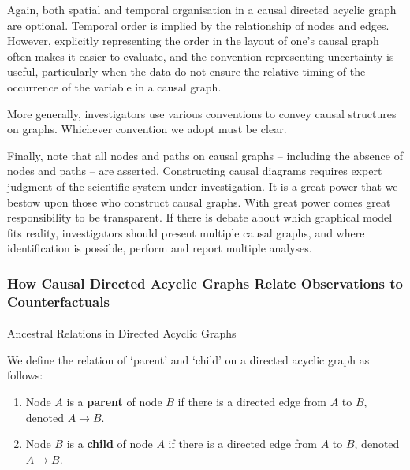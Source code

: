 \documentclass[
  single column]{article}
\makeatletter
\let\oldparagraph\paragraph
\renewcommand{\paragraph}{
    \@ifstar
      \xxxParagraphStar
      \xxxParagraphNoStar
  }
\newcommand{\xxxParagraphStar}[1]{\oldparagraph*{#1}\mbox{}}
\newcommand{\xxxParagraphNoStar}[1]{\oldparagraph{#1}\mbox{}}
\providecommand{\tightlist}{%
  \setlength{\itemsep}{0pt}\setlength{\parskip}{0pt}}\usepackage{longtable,booktabs,array}
\makeatother
\begin{document}
Again, both spatial and temporal organisation in a causal directed
acyclic graph are optional. Temporal order is implied by the
relationship of nodes and edges. However, explicitly representing the
order in the layout of one's causal graph often makes it easier to
evaluate, and the convention representing uncertainty is useful,
particularly when the data do not ensure the relative timing of the
occurrence of the variable in a causal graph.

More generally, investigators use various conventions to convey causal
structures on graphs. Whichever convention we adopt must be clear.

Finally, note that all nodes and paths on causal graphs -- including the
absence of nodes and paths -- are asserted. Constructing causal diagrams
requires expert judgment of the scientific system under investigation.
It is a great power that we bestow upon those who construct causal
graphs. With great power comes great responsibility to be transparent.
If there is debate about which graphical model fits reality,
investigators should present multiple causal graphs, and where
identification is possible, perform and report multiple analyses.

\subsubsection{How Causal Directed Acyclic Graphs Relate Observations to
Counterfactuals}\label{how-causal-directed-acyclic-graphs-relate-observations-to-counterfactuals}

\paragraph{Ancestral Relations in Directed Acyclic
Graphs}\label{ancestral-relations-in-directed-acyclic-graphs}

We define the relation of `parent' and `child' on a directed acyclic
graph as follows:

\begin{enumerate}
\def\labelenumi{\arabic{enumi}.}
\tightlist
\item
  Node \(A\) is a \textbf{parent} of node \(B\) if there is a directed
  edge from \(A\) to \(B\), denoted \(A \rightarrow B\).
\item
  Node \(B\) is a \textbf{child} of node \(A\) if there is a directed
  edge from \(A\) to \(B\), denoted \(A \rightarrow B\).
\end{enumerate}
\end{document}
